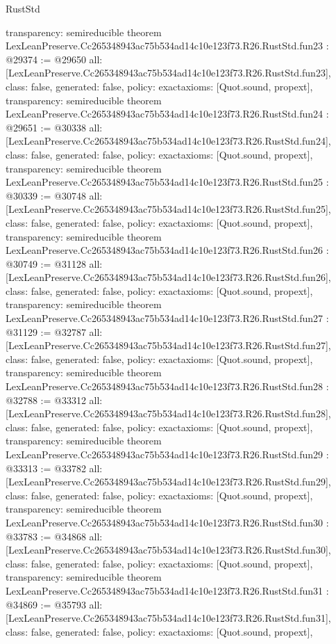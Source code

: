 \begin{lexlean}{RustStd}
\begin{coremodule}
{  transparency: semireducible
}
theorem LexLeanPreserve.Cc265348943ac75b534ad14c10e123f73.R26.RustStd.fun23 : @29374 := @29650 {
  all: [LexLeanPreserve.Cc265348943ac75b534ad14c10e123f73.R26.RustStd.fun23],
  class: false,
  generated: false,
  policy: exact{axioms: [Quot.sound, propext]},
  transparency: semireducible
}
theorem LexLeanPreserve.Cc265348943ac75b534ad14c10e123f73.R26.RustStd.fun24 : @29651 := @30338 {
  all: [LexLeanPreserve.Cc265348943ac75b534ad14c10e123f73.R26.RustStd.fun24],
  class: false,
  generated: false,
  policy: exact{axioms: [Quot.sound, propext]},
  transparency: semireducible
}
theorem LexLeanPreserve.Cc265348943ac75b534ad14c10e123f73.R26.RustStd.fun25 : @30339 := @30748 {
  all: [LexLeanPreserve.Cc265348943ac75b534ad14c10e123f73.R26.RustStd.fun25],
  class: false,
  generated: false,
  policy: exact{axioms: [Quot.sound, propext]},
  transparency: semireducible
}
theorem LexLeanPreserve.Cc265348943ac75b534ad14c10e123f73.R26.RustStd.fun26 : @30749 := @31128 {
  all: [LexLeanPreserve.Cc265348943ac75b534ad14c10e123f73.R26.RustStd.fun26],
  class: false,
  generated: false,
  policy: exact{axioms: [Quot.sound, propext]},
  transparency: semireducible
}
theorem LexLeanPreserve.Cc265348943ac75b534ad14c10e123f73.R26.RustStd.fun27 : @31129 := @32787 {
  all: [LexLeanPreserve.Cc265348943ac75b534ad14c10e123f73.R26.RustStd.fun27],
  class: false,
  generated: false,
  policy: exact{axioms: [Quot.sound, propext]},
  transparency: semireducible
}
theorem LexLeanPreserve.Cc265348943ac75b534ad14c10e123f73.R26.RustStd.fun28 : @32788 := @33312 {
  all: [LexLeanPreserve.Cc265348943ac75b534ad14c10e123f73.R26.RustStd.fun28],
  class: false,
  generated: false,
  policy: exact{axioms: [Quot.sound, propext]},
  transparency: semireducible
}
theorem LexLeanPreserve.Cc265348943ac75b534ad14c10e123f73.R26.RustStd.fun29 : @33313 := @33782 {
  all: [LexLeanPreserve.Cc265348943ac75b534ad14c10e123f73.R26.RustStd.fun29],
  class: false,
  generated: false,
  policy: exact{axioms: [Quot.sound, propext]},
  transparency: semireducible
}
theorem LexLeanPreserve.Cc265348943ac75b534ad14c10e123f73.R26.RustStd.fun30 : @33783 := @34868 {
  all: [LexLeanPreserve.Cc265348943ac75b534ad14c10e123f73.R26.RustStd.fun30],
  class: false,
  generated: false,
  policy: exact{axioms: [Quot.sound, propext]},
  transparency: semireducible
}
theorem LexLeanPreserve.Cc265348943ac75b534ad14c10e123f73.R26.RustStd.fun31 : @34869 := @35793 {
  all: [LexLeanPreserve.Cc265348943ac75b534ad14c10e123f73.R26.RustStd.fun31],
  class: false,
  generated: false,
  policy: exact{axioms: [Quot.sound, propext]},
}
\end{coremodule}
\end{lexlean}
